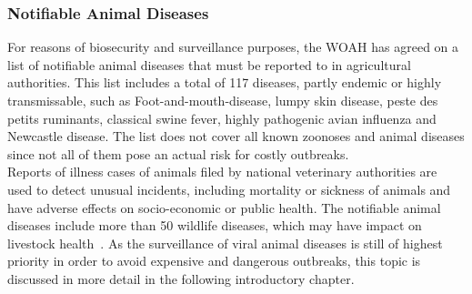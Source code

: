 \subsubsection*{Notifiable Animal Diseases}
For reasons of biosecurity and surveillance purposes, the WOAH has agreed on a list of notifiable animal diseases that must be reported to in agricultural authorities. This list includes a total of 117 diseases, partly endemic or highly transmissable, such as Foot-and-mouth-disease, lumpy skin disease, peste des petits ruminants, classical swine fever, highly pathogenic avian influenza and Newcastle disease. The list does not cover all known zoonoses and animal diseases since not all of them pose an actual risk for costly outbreaks. \\
Reports of illness cases of animals filed by national veterinary authorities are used to detect unusual incidents, including mortality or sickness of animals and have adverse effects on socio-economic or public health. The notifiable animal diseases include more than 50 wildlife diseases, which may have impact on livestock health~\cite{woah2023list}. As the surveillance of viral animal diseases is still of highest priority in order to avoid expensive and dangerous outbreaks, this topic is discussed in more detail in the following introductory chapter.


